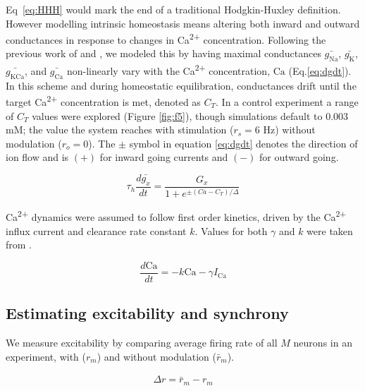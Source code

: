 \documentclass{article}
\begin{document}
Eq~\ref{eq:HHH} would mark the end of a traditional Hodgkin-Huxley definition. However modelling intrinsic homeostasis means altering both inward and outward conductances in response to changes in Ca\textsuperscript{2+} concentration. Following the previous work of \cite{LeMasson1993} and \cite{Siegel1994}, we modeled this by having maximal conductances $\bar{g_\text{Na}}$, $\bar{g_\text{K}}$, $\bar{g_\text{KCa}}$, and $\bar{g_\text{Ca}}$ non-linearly vary with the Ca\textsuperscript{2+} concentration, $\text{Ca}$ (Eq.\ref{eq:dgdt}). In this scheme and during homeostatic equilibration, conductances drift until the target Ca\textsuperscript{2+} concentration is met, denoted as $C_T$. In a control experiment a range of $C_T$ values were explored (Figure \ref{fig:f5}), though simulations default to 0.003 mM; the value the system reaches with stimulation ($r_s = 6$ Hz) without modulation ($r_o = 0$). The $\pm$ symbol in equation \ref{eq:dgdt} denotes the direction of ion flow and is $(+)$ for inward going currents and $(-)$ for outward going.

\begin{equation}
\label{eq:dgdt}
\tau_h \frac{d \bar{g_x}}{dt} = \frac{G_x}{1 + e^{\pm (Ca - C_T)/\Delta}}
\end{equation}

Ca\textsuperscript{2+} dynamics were assumed to follow first order kinetics, driven by the Ca\textsuperscript{2+} influx current and clearance rate constant $k$. Values for both $\gamma$ and $k$ were taken from \cite{Liu1998}.

\begin{equation}
\label{eq:passive}
\frac{d\text{Ca}}{dt} = -k \text{Ca} - \gamma I_\text{Ca}
\end{equation}

\subsection*{Estimating excitability and synchrony}
We measure excitability by comparing average firing rate of all $M$ neurons in an experiment, with ($r_m$) and without modulation ($\bar{r}_m$). 

\begin{align}
    \label{eq:excite}
    \Delta r = \bar{r}_m - r_m
\end{align}
\end{document}
